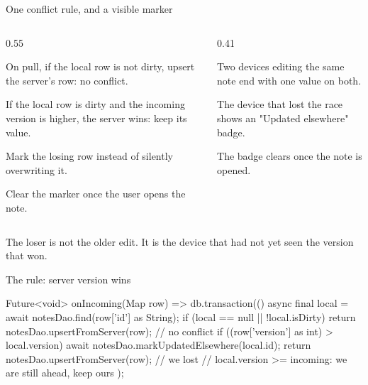 \documentclass[10pt,aspectratio=169,t]{beamer}
\begin{document}
\begin{frame}[eyebrow=Task III]{One conflict rule, and a visible marker}
  \begin{columns}[T]
    \begin{column}{0.55\textwidth}
      \begin{steps}
        \item On pull, if the local row is not dirty, upsert the server's row: no conflict.
        \item If the local row is dirty and the incoming version is higher, the server wins: keep its value.
        \item Mark the losing row  instead of silently overwriting it.
        \item Clear the marker once the user opens the note.
      \end{steps}
    \end{column}
    \begin{column}{0.41\textwidth}
      \begin{checklist}
        \item Two devices editing the same note end with one value on both.
        \item The device that lost the race shows an "Updated elsewhere" badge.
        \item The badge clears once the note is opened.
      \end{checklist}
    \end{column}
  \end{columns}
  \begin{takeaway}{The loser is not the older edit.}
    It is the device that had not yet seen the version that won.
  \end{takeaway}
\end{frame}

\begin{frame}[fragile,eyebrow=Task III]{The rule: server version wins}
  \vskip 1mm
\begin{dart}
Future<void> onIncoming(Map row) => db.transaction(() async {
  final local = await notesDao.find(row['id'] as String);
  if (local == null || !local.isDirty) {
    return notesDao.upsertFromServer(row);      // no conflict
  }
  if ((row['version'] as int) > local.version) {
    await notesDao.markUpdatedElsewhere(local.id);
    return notesDao.upsertFromServer(row);      // we lost
  }
  // local.version >= incoming: we are still ahead, keep ours
});
\end{dart}
\end{frame}
\end{document}
